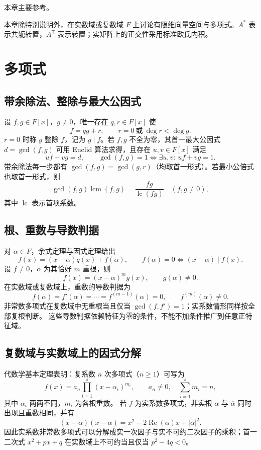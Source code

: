 \documentclass[../main.tex]{subfiles}
\begin{document}
本章主要参考\cite{matrix,shoup}。

本章除特别说明外，在实数域或复数域 $F$ 上讨论有限维向量空间与多项式。$A^*$ 表示共轭转置，$A^{\mathsf T}$ 表示转置；实矩阵上的正交性采用标准欧氏内积。
\section{多项式}
\subsection{带余除法、整除与最大公因式}
设 $f,g\in F[x]$，$g\ne0$，唯一存在 $q,r\in F[x]$ 使
\[
f=qg+r,\qquad r=0\ \text{或}\ \deg r<\deg g.
\]
$r=0$ 时称 $g$ 整除 $f$，记为 $g\mid f$。若 $f,g$ 不全为零，其首一最大公因式 $d=\gcd(f,g)$ 可用 Euclid 算法求得，且存在 $u,v\in F[x]$ 满足
\[
uf+vg=d,\qquad
\gcd(f,g)=1\iff\exists u,v:\ uf+vg=1.
\]
带余除法每一步都有 $\gcd(f,g)=\gcd(g,r)$（均取首一形式）。若最小公倍式也取首一形式，则
\[
\gcd(f,g)\operatorname{lcm}(f,g)=\frac{fg}{\operatorname{lc}(fg)}
\quad(f,g\ne0),
\]
其中 $\operatorname{lc}$ 表示首项系数。
\subsection{根、重数与导数判据}
对 $\alpha\in F$，余式定理与因式定理给出
\[
f(x)=(x-\alpha)q(x)+f(\alpha),\qquad
f(\alpha)=0\iff(x-\alpha)\mid f(x).
\]
设 $f\ne0$，$\alpha$ 为其恰好 $m$ 重根，则
\[
f(x)=(x-\alpha)^m g(x),\qquad g(\alpha)\ne0.
\]
在实数域或复数域上，重数的导数判据为
\[
f(\alpha)=f'(\alpha)=\cdots=f^{(m-1)}(\alpha)=0,\qquad
f^{(m)}(\alpha)\ne0.
\]
非常数多项式在复数域中无重根当且仅当 $\gcd(f,f')=1$；实系数情形同样按全部复根判断。
这些导数判据依赖特征为零的条件，不能不加条件推广到任意正特征域。
\subsection{复数域与实数域上的因式分解}
代数学基本定理表明：复系数 $n$ 次多项式（$n\ge1$）可写为
\[
f(x)=a_n\prod_{i=1}^s(x-\alpha_i)^{m_i},\qquad
a_n\ne0,\quad\sum_{i=1}^s m_i=n,
\]
其中 $\alpha_i$ 两两不同，$m_i$ 为各根重数。
若 $f$ 为实系数多项式，非实根 $\alpha$ 与 $\overline\alpha$ 同时出现且重数相同，并有
\[
(x-\alpha)(x-\overline\alpha)
=x^2-2\operatorname{Re}(\alpha)x+|\alpha|^2.
\]
因此实系数非常数多项式可以分解成实一次因子与实不可约二次因子的乘积；首一二次式 $x^2+px+q$ 在实数域上不可约当且仅当 $p^2-4q<0$。
\end{document}

